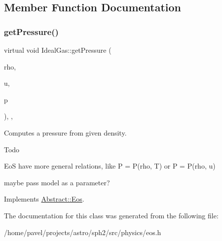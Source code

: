\subsection{Member Function Documentation}
\hypertarget{classIdealGas_a27ee0a167bbb7e5690ce6db5fca39ba1}{}\label{classIdealGas_a27ee0a167bbb7e5690ce6db5fca39ba1} 
\subsubsection{\texorpdfstring{get\+Pressure()}{getPressure()}}
{\footnotesize\ttfamily virtual void Ideal\+Gas\+::get\+Pressure (\begin{DoxyParamCaption}\item[{\hyperlink{classArrayView}{Array\+View}$<$ const Float $>$}]{rho,  }\item[{\hyperlink{classArrayView}{Array\+View}$<$ const Float $>$}]{u,  }\item[{\hyperlink{classArrayView}{Array\+View}$<$ Float $>$}]{p }\end{DoxyParamCaption})\hspace{0.3cm}{\ttfamily [inline]}, {\ttfamily [override]}, {\ttfamily [virtual]}}

Computes a pressure from given density. \begin{DoxyRefDesc}{Todo}
\item[\hyperlink{todo__todo000018}{Todo}]EoS have more general relations, like P = P(rho, T) or P = P(rho, u) 

maybe pass model as a parameter? \end{DoxyRefDesc}


Implements \hyperlink{classAbstract_1_1Eos_ab21906f5fc78370a10cdbf97983544ea}{Abstract\+::\+Eos}.



The documentation for this class was generated from the following file\+:\begin{DoxyCompactItemize}
\item 
/home/pavel/projects/astro/sph2/src/physics/eos.\+h\end{DoxyCompactItemize}
